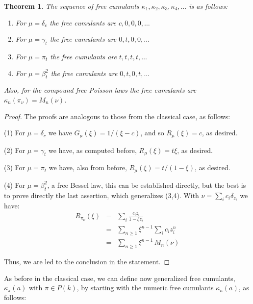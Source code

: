 \documentclass[12pt]{amsbook}
\newtheorem{theorem}{Theorem}[chapter]
\begin{document}
\begin{theorem}
The sequence of free cumulants $\kappa_1,\kappa_2,\kappa_3,\kappa_4,\ldots$ is as follows:
\begin{enumerate}
\item For $\mu=\delta_c$ the free cumulants are $c,0,0,0,\ldots$

\item For $\mu=\gamma_t$ the free cumulants are $0,t,0,0,\ldots$

\item For $\mu=\pi_t$ the free cumulants are $t,t,t,t,\ldots$

\item For $\mu=\beta_t^2$ the free cumulants are $0,t,0,t,\ldots$
\end{enumerate}
Also, for the compound free Poisson laws the free cumulants are $\kappa_n(\pi_\nu)=M_n(\nu)$.
\end{theorem}

\begin{proof}
The proofs are analogous to those from the classical case, as follows:

\medskip

(1) For $\mu=\delta_c$ we have $G_\mu(\xi)=1/(\xi-c)$, and so $R_\mu(\xi)=c$, as desired.

\medskip

(2) For $\mu=\gamma_t$ we have, as computed before, $R_\mu(\xi)=t\xi$, as desired.

\medskip

(3) For $\mu=\pi_t$ we have, also from before, $R_\mu(\xi)=t/(1-\xi)$, as desired.

\medskip

(4) For $\mu=\beta_t^2$, a free Bessel law, this can be established directly, but the best is to prove directly the last assertion, which generalizes (3,4). With $\nu=\sum_ic_i\delta_{z_i}$ we have:
\begin{eqnarray*}
R_{\pi_\nu}(\xi)
&=&\sum_i\frac{c_iz_i}{1-\xi z_i}\\
&=&\sum_{n\geq1}\xi^{n-1}\sum_ic_iz_i^n\\
&=&\sum_{n\geq 1}\xi^{n-1}\,M_n(\nu)
\end{eqnarray*}

Thus, we are led to the conclusion in the statement.
\end{proof}

As before in the classical case, we can define now generalized free cumulants, $\kappa_\pi(a)$ with $\pi\in P(k)$, by starting with the numeric free cumulants $\kappa_n(a)$, as follows:
\end{document}
